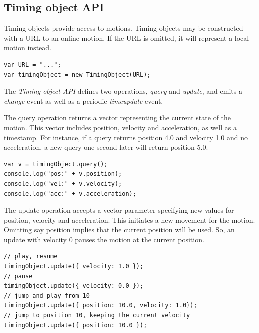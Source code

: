 \documentclass[graybox]{svmult}
\begin{document}
\subsection{Timing object API}
\label{sec:motionapi}

Timing objects provide access to motions. Timing objects may be constructed
with a URL to an online motion. If the URL is omitted, it will represent a
local motion instead.

\begin{lstlisting}[caption=Constructing a timing object.]
var URL = "...";
var timingObject = new TimingObject(URL);
\end{lstlisting}

The \emph{Timing object API} defines two operations, \emph{query} and
\emph{update}, and emits a \emph{change} event as well as a periodic
\emph{timeupdate} event.



The query operation returns a vector representing the current state of the
motion. This vector includes position, velocity and acceleration, as well as a
timestamp. For instance, if a query returns position 4.0 and velocity 1.0 and no acceleration, a
new query one second later will return position 5.0.

\begin{lstlisting}[caption=Querying the timing object to get a snapshot vector.]
var v = timingObject.query();
console.log("pos:" + v.position);
console.log("vel:" + v.velocity);
console.log("acc:" + v.acceleration);
\end{lstlisting}



The update operation accepts a vector parameter specifying new values for
position, velocity and acceleration. This initiates a new movement for the
motion. Omitting say position implies that the current position will be used.
So, an update with velocity 0 pauses the motion at the current position.

\begin{lstlisting}[caption=Updating the timing object.]
// play, resume
timingObject.update({ velocity: 1.0 }); 
// pause
timingObject.update({ velocity: 0.0 });
// jump and play from 10
timingObject.update({ position: 10.0, velocity: 1.0});
// jump to position 10, keeping the current velocity
timingObject.update({ position: 10.0 });
\end{lstlisting}


\end{document}
